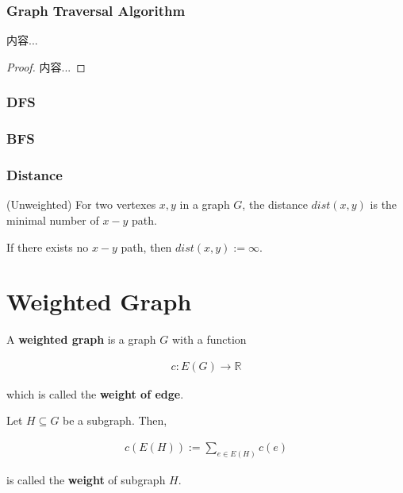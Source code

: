 \documentclass[Total.tex]{subfiles}
\begin{document}
		\subsubsection{Graph Traversal Algorithm}
		
		\begin{proposition}
			内容...
		\end{proposition}	
		
		\begin{proof}
			内容...
		\end{proof}
		\subsubsection{DFS}
		\subsubsection{BFS}
		
		\subsubsection{Distance}
		
		\begin{Def}
			(Unweighted) For two vertexes $x,y$ in a graph $G$, the distance $dist(x,y)$ is the minimal number of $x-y$ path.
			
			If there exists no $x-y$ path, then $dist(x,y):=\infty$.
		\end{Def}
		\section{Weighted Graph}
		
		\begin{Def}
			A \textbf{weighted graph} is a graph $G$ with a function
			
			\begin{gather*}
				c:E(G)\rightarrow \mathbb{R}
			\end{gather*}
			
			which is called the \textbf{weight of edge}.
		\end{Def}
		
		Let $H\subseteq G$ be a subgraph. Then, 
		
		\begin{gather*}
			c(E(H)):=\sum_{e\in E(H)} c(e)
		\end{gather*}
		
		is called the \textbf{weight} of subgraph $H$.
		
\end{document}
